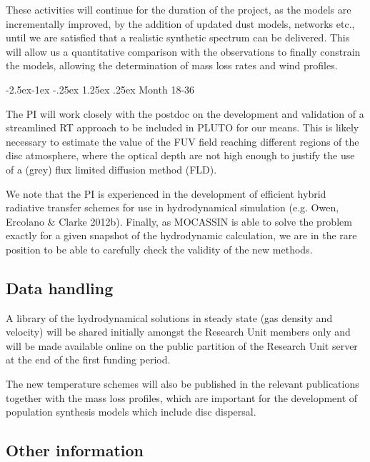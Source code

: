 \documentclass[10pt,fleqn,twoside]{article}
\makeatletter
\newcommand{\Tcol}{\color{blue}}
\renewcommand\paragraph{\@startsection{paragraph}{4}{\z@}%
            {-2.5ex\@plus -1ex \@minus -.25ex}%
            {1.25ex \@plus .25ex}%
            {\normalfont\normalsize\bfseries}}
\makeatother
\begin{document}
These activities will continue for the duration of the project, as the
models are incrementally improved, by the addition of updated dust
models, networks etc., until we are satisfied that a realistic
synthetic spectrum can be delivered. This will allow us a quantitative
comparison with the observations to finally constrain the models,
allowing the determination of mass loss rates and wind profiles. 

\paragraph{Month 18-36}

The PI will work closely with the postdoc on the development and
validation of a streamlined RT approach to be included in PLUTO for
our means. This is likely necessary to estimate the value of the  FUV field
reaching different regions of the disc atmosphere, where the optical
depth are not high enough to justify the use of a  (grey) flux
limited diffusion method (FLD). 

We note that the PI is experienced in the development of efficient hybrid radiative
transfer schemes for use in hydrodynamical simulation (e.g. Owen,
Ercolano \& Clarke 2012b). 
Finally, as MOCASSIN is able
to solve the problem exactly for a given snapshot of the hydrodynamic
calculation, we are in the rare position to be able to carefully
check the validity of the new methods.  

\subsection{\Tcol Data handling}

A library of the hydrodynamical solutions in steady state (gas density
and velocity)  will be shared initially amongst the Research Unit
members only and will be made available online on the public partition
of the Research Unit server at the end of the first funding period. 

The new temperature schemes will also be published in the relevant
publications together with the mass loss profiles, which are important
for the development of population synthesis models which include disc
dispersal. 

\subsection{\Tcol Other information}
\end{document}
